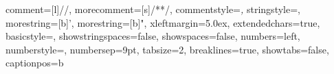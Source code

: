 {    %
	comment=[l]{//},
	morecomment=[s]{/*}{*/},
    commentstyle=\color{CadetBlue}\textit,
	stringstyle=\color{ForestGreen},
	morestring=[b]',
	morestring=[b]",
    xleftmargin=5.0ex,
    extendedchars=true,
	basicstyle=\small\ttfamily,
	showstringspaces=false,
	showspaces=false,
	numbers=left,
	numberstyle=\footnotesize,
	numbersep=9pt,
	tabsize=2,
	breaklines=true,
	showtabs=false,
	captionpos=b
}

